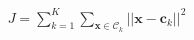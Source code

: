 \documentclass[preview]{standalone}
\begin{document}
\begin{align*}
J = \sum_{k=1}^K \sum_{\mathbf{x} \in \mathcal{C}_k} ||\mathbf{x} - \mathbf{c}_k||^2
\end{align*}
\end{document}
